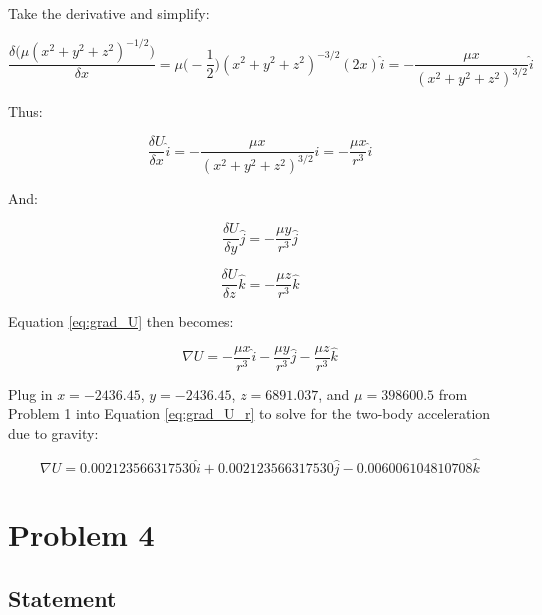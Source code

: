 \documentclass[conf]{new-aiaa}
\begin{document}
Take the derivative and simplify: 

\begin{equation}
\dfrac{\delta \big( \mu ( x^2 + y^2 + z^2 )^{-1/2} \big) }{ \delta x } = 
 \mu \Big( -\frac{1}{2} \Big) ( x^2 + y^2 + z^2 )^{-3/2} ( 2x ) \hat{i} = 
 - \dfrac{\mu x}{ ( x^2 + y^2 + z^2 )^{3/2} } \hat{i}
\end{equation}

Thus: 

\begin{equation}
\frac{\delta U}{\delta x} \hat{i} = - \dfrac{\mu x}{ ( x^2 + y^2 + z^2 )^{3/2} } \hat{i} = - \dfrac{\mu x}{r^3} \hat{i}
\end{equation}

And: 

\begin{equation}
\frac{\delta U}{\delta y} \hat{j} = - \dfrac{\mu y}{r^3} \hat{j}
\end{equation}

\begin{equation}
\frac{\delta U}{\delta z} \hat{k} = - \dfrac{\mu z}{r^3} \hat{k}
\end{equation}

Equation \ref{eq:grad_U} then becomes: 

\begin{equation}
\nabla U = - \dfrac{\mu x}{r^3} \hat{i} - \dfrac{\mu y}{r^3} \hat{j} - \dfrac{\mu z}{r^3} \hat{k}
\label{eq:grad_U_r}
\end{equation}

Plug in $x = -2436.45$, $y = -2436.45$, $z = 6891.037$, and $\mu = 398600.5$ from Problem 1 into Equation \ref{eq:grad_U_r} to solve for the two-body acceleration due to gravity: 

\begin{equation}
\nabla U = 0.002123566317530 \hat{i} + 0.002123566317530 \hat{j} - 0.006006104810708 \hat{k}
\end{equation}




\section{Problem 4} 

\subsection{Statement} 
\begin{center}
	 \\
\end{center}
\end{document}
